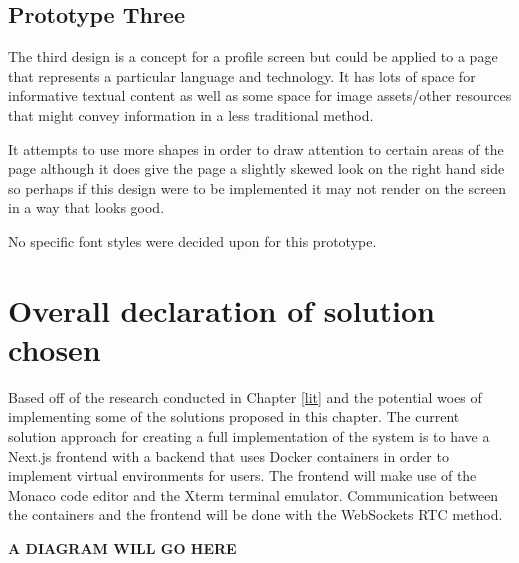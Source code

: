 \subsection{Prototype Three}

The third design is a concept for a profile screen but could be applied to a page that represents a particular language and technology. It has lots of space for informative textual content as well as some space for image assets/other resources that might convey information in a less traditional method.

It attempts to use more shapes in order to draw attention to certain areas of the page although it does give the page a slightly skewed look on the right hand side so perhaps if this design were to be implemented it may not render on the screen in a way that looks good.

No specific font styles were decided upon for this prototype.

\section{Overall declaration of solution chosen}

Based off of the research conducted in Chapter \ref{lit} and the potential woes of implementing some of the solutions proposed in this chapter. The current solution approach for creating a full implementation of the system is to have a Next.js frontend with a backend that uses Docker containers in order to implement virtual environments for users. The frontend will make use of the Monaco code editor and the Xterm terminal emulator. Communication between the containers and the frontend will be done with the WebSockets RTC method.

\textbf{A DIAGRAM WILL GO HERE}


\pagebreak

